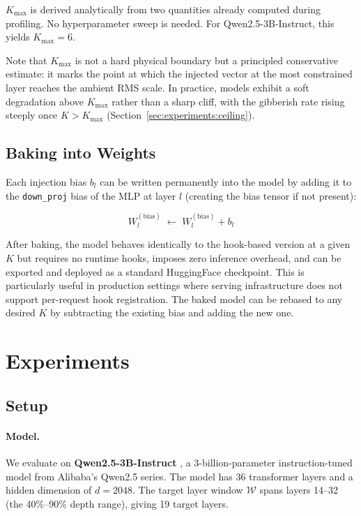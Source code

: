 \documentclass[10pt]{article}
\begin{document}
$K_\text{max}$ is derived analytically from two quantities already computed
during profiling.  No hyperparameter sweep is needed.  For Qwen2.5-3B-Instruct,
this yields $K_\text{max} = 6$.

Note that $K_\text{max}$ is not a hard physical boundary but a principled
conservative estimate: it marks the point at which the injected vector at
the most constrained layer reaches the ambient RMS scale.  In practice,
models exhibit a soft degradation above $K_\text{max}$ rather than a
sharp cliff, with the gibberish rate rising steeply once $K > K_\text{max}$
(Section~\ref{sec:experiments:ceiling}).

\subsection{Baking into Weights}
\label{sec:method:baking}

Each injection bias $b_l$ can be written permanently into the model by adding
it to the \texttt{down\_proj} bias of the MLP at layer $l$ (creating the bias
tensor if not present):

\begin{equation}
  W^{(\text{bias})}_l \;\leftarrow\; W^{(\text{bias})}_l + b_l
  \label{eq:baking}
\end{equation}

After baking, the model behaves identically to the hook-based version at a
given $K$ but requires no runtime hooks, imposes zero inference overhead, and
can be exported and deployed as a standard HuggingFace checkpoint.  This is
particularly useful in production settings where serving infrastructure does
not support per-request hook registration.  The baked model can be rebased to
any desired $K$ by subtracting the existing bias and adding the new one.

\section{Experiments}
\label{sec:experiments}

\subsection{Setup}
\label{sec:experiments:setup}

\paragraph{Model.}
We evaluate on \textbf{Qwen2.5-3B-Instruct} \citep{qwen2025qwen25}, a
3-billion-parameter instruction-tuned model from Alibaba's Qwen2.5 series.
The model has 36 transformer layers and a hidden dimension of $d = 2048$.
The target layer window $\mathcal{W}$ spans layers 14--32 (the 40\%--90\%
depth range), giving 19 target layers.
\end{document}

